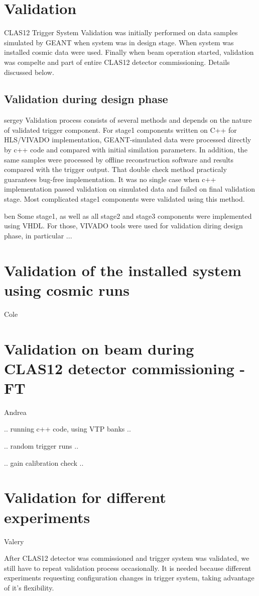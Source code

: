\section{Validation}

CLAS12 Trigger System Validation was initially performed on data samples simulated by GEANT when system was in design stage. When system was installed cosmic data were used. Finally when beam operation started, validation was compelte and part of entire CLAS12 detector commissioning. Details discussed below.

\subsection{Validation during design phase}

sergey
Validation process consists of several methods and depends on the nature of validated trigger component. For stage1 components written on C++ for HLS/VIVADO implementation,
GEANT-simulated data were processed directly by c++ code and compared with initial similation parameters. 
In addition, the same samples were processed by offline reconstruction software and results compared with the trigger output. 
That double check method practicaly guarantees bug-free implementation. It was no single case when c++ implementation passed validation on
simulated data and failed on final validation stage. Most complicated stage1 components were validated using this method.

ben
Some stage1, as well as all stage2 and stage3 components were implemented using VHDL. For those, VIVADO tools were used for validation diring design phase, in particular ...

\section{Validation of the installed system using cosmic runs} Cole




\section{Validation on beam during CLAS12 detector commissioning - FT} Andrea

.. running c++ code, using VTP banks ..

.. random trigger runs .. 

.. gain calibration check .. 


\section{Validation for different experiments} Valery

After CLAS12 detector was commissioned and trigger system was validated, we still have to repeat validation process occasionally. It is needed because different experiments requesting configuration changes in trigger system, taking advantage of it's flexibility.